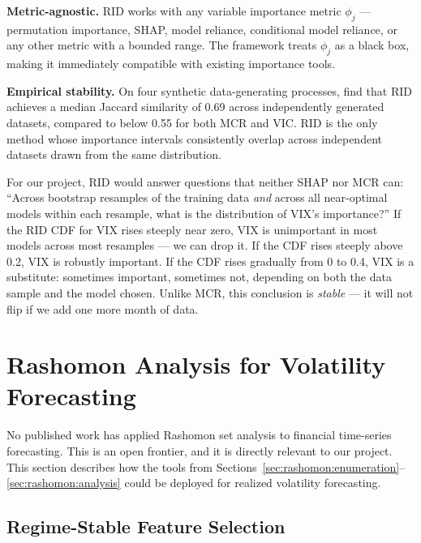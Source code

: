 \textbf{Metric-agnostic.}  RID works with any variable importance metric
$\phi_j$ --- permutation importance, SHAP, model reliance, conditional
model reliance, or any other metric with a bounded range.  The framework
treats $\phi_j$ as a black box, making it immediately compatible with
existing importance tools.

\textbf{Empirical stability.}  On four synthetic data-generating
processes, \citet{DonnellyEtAl2023} find that RID achieves a median
Jaccard similarity of 0.69 across independently generated datasets,
compared to below 0.55 for both MCR and VIC.  RID is the only method
whose importance intervals consistently overlap across independent
datasets drawn from the same distribution.

\begin{projectconnection}
For our project, RID would answer questions that neither SHAP nor MCR can:
``Across bootstrap resamples of the training data \emph{and} across all
near-optimal models within each resample, what is the distribution of
VIX's importance?''  If the RID CDF for VIX rises steeply near zero, VIX
is unimportant in most models across most resamples --- we can drop it.
If the CDF rises steeply above 0.2, VIX is robustly important.  If the
CDF rises gradually from 0 to 0.4, VIX is a substitute: sometimes
important, sometimes not, depending on both the data sample and the model
chosen.  Unlike MCR, this conclusion is \emph{stable} --- it will not
flip if we add one more month of data.
\end{projectconnection}


\section{Rashomon Analysis for Volatility Forecasting}
\label{sec:rashomon:vol}

No published work has applied Rashomon set analysis to financial time-series
forecasting.  This is an open frontier, and it is directly relevant to our
project.  This section describes how the tools from
Sections~\ref{sec:rashomon:enumeration}--\ref{sec:rashomon:analysis} could be
deployed for realized volatility forecasting.

\subsection{Regime-Stable Feature Selection}


